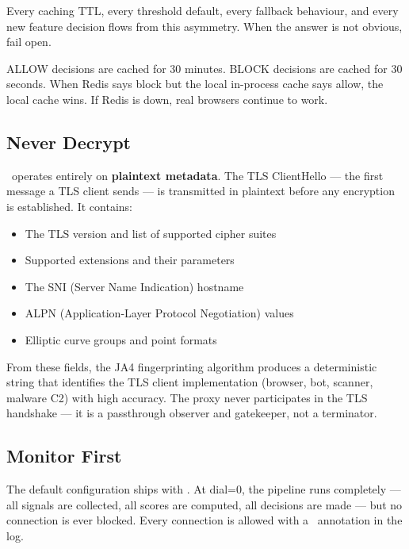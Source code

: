 Every caching TTL, every threshold default, every fallback behaviour, and every new
feature decision flows from this asymmetry. When the answer is not obvious, fail open.

\begin{importantbox}
ALLOW decisions are cached for 30 minutes. BLOCK decisions are cached for 30 seconds.
When Redis says block but the local in-process cache says allow, the local cache wins.
If Redis is down, real browsers continue to work.
\end{importantbox}

\subsection{Never Decrypt}

\ja\ operates entirely on \textbf{plaintext metadata}. The TLS ClientHello — the
first message a TLS client sends — is transmitted in plaintext before any encryption
is established. It contains:

\begin{itemize}
  \item The TLS version and list of supported cipher suites
  \item Supported extensions and their parameters
  \item The SNI (Server Name Indication) hostname
  \item ALPN (Application-Layer Protocol Negotiation) values
  \item Elliptic curve groups and point formats
\end{itemize}

From these fields, the JA4 fingerprinting algorithm produces a deterministic string
that identifies the TLS client implementation (browser, bot, scanner, malware C2)
with high accuracy. The proxy never participates in the TLS handshake — it is a
passthrough observer and gatekeeper, not a terminator.

\subsection{Monitor First}

The default configuration ships with . At dial=0, the pipeline
runs completely — all signals are collected, all scores are computed, all decisions
are made — but no connection is ever blocked. Every connection is allowed with a
\badgemonitor\ annotation in the log.

